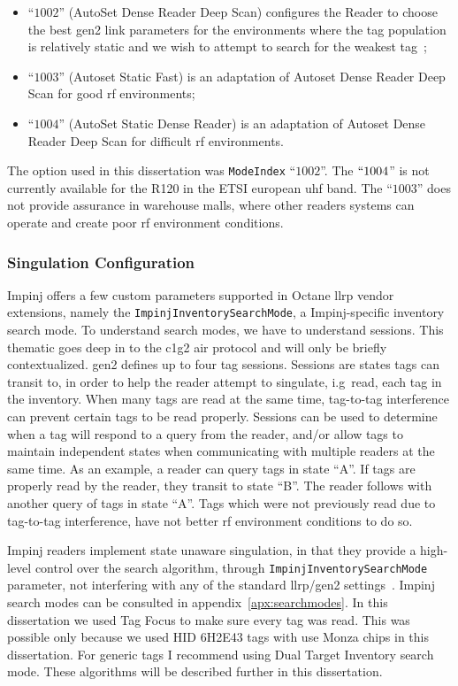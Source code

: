 \begin{itemize}
    \item ``$1002$'' (AutoSet Dense Reader Deep Scan) configures the Reader to choose the best \ac{gen2} link parameters for the environments where the tag population is relatively static and we wish to attempt to search for the weakest tag~\cite{ReaderMode1002};
    \item ``$1003$'' (Autoset Static Fast) is an adaptation of Autoset Dense Reader Deep Scan for good \ac{rf} environments;
    \item ``$1004$'' (AutoSet Static Dense Reader) is an adaptation of Autoset Dense Reader Deep Scan for difficult \ac{rf} environments.
\end{itemize}

The option used in this dissertation was \texttt{ModeIndex} ``$1002$''. The $``1004$'' is not currently available for the R120 in the ETSI european \ac{uhf} band. The ``$1003$'' does not provide assurance in warehouse malls, where other readers systems can operate and create poor \ac{rf} environment conditions.

\subsubsection{Singulation Configuration}

Impinj offers a few custom parameters supported in Octane \ac{llrp} vendor extensions, namely the \texttt{ImpinjInventorySearchMode}, a Impinj-specific inventory search mode. 
To understand search modes, we have to understand sessions. This thematic goes deep in to the \ac{c1g2} air protocol and will only be briefly contextualized. \ac{gen2} defines up to four tag sessions. Sessions are states tags can transit to, in order to help the reader attempt to singulate, i.g\ read, each tag in the inventory.
When many tags are read at the same time, tag-to-tag interference can prevent certain tags to be read properly.
Sessions can be used to determine when a tag will respond to a query from the reader, and/or allow tags to maintain independent states when communicating with multiple readers at the same time.
As an example, a reader can query tags in state ``A''. If tags are properly read by the reader, they transit to state ``B''. The reader follows with another query of tags in state ``A''. Tags which were not previously read due to tag-to-tag interference, have not better \ac{rf} environment conditions to do so.

Impinj readers implement state unaware singulation, in that they provide a high-level control over the search algorithm, through \texttt{ImpinjInventorySearchMode} parameter, not interfering with any of the standard \ac{llrp}/\ac{gen2} settings~\cite{ImpinjOctaneLLRP, UnderstandingEPCGen2}.
Impinj search modes can be consulted in appendix~\ref{apx:searchmodes}.
In this dissertation we used Tag Focus to make sure every tag was read. This was possible only because we used HID 6H2E43 tags with use Monza chips in this dissertation. For generic tags I recommend using Dual Target Inventory search mode. These algorithms will be described further in this dissertation.

